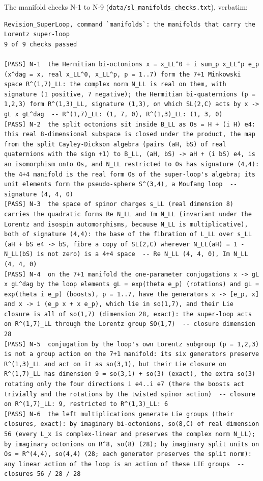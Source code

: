 \documentclass[
  10pt,
]{article}
\begin{document}
The manifold checks N-1 to N-9
(\texttt{data/sl\_manifolds\_checks.txt}), verbatim:

\begin{verbatim}
Revision_SuperLoop, command `manifolds`: the manifolds that carry the Lorentz super-loop
9 of 9 checks passed

[PASS] N-1  the Hermitian bi-octonions x = x_LL^0 + i sum_p x_LL^p e_p (x^dag = x, real x_LL^0, x_LL^p, p = 1..7) form the 7+1 Minkowski space R^(1,7)_LL: the complex norm N_LL is real on them, with signature (1 positive, 7 negative); the Hermitian bi-quaternions (p = 1,2,3) form R^(1,3)_LL, signature (1,3), on which SL(2,C) acts by x -> gL x gL^dag  -- R^(1,7)_LL: (1, 7, 0), R^(1,3)_LL: (1, 3, 0)
[PASS] N-2  the split octonions sit inside B_LL as Os = H + (i H) e4: this real 8-dimensional subspace is closed under the product, the map from the split Cayley-Dickson algebra (pairs (aH, bS) of real quaternions with the sign +1) to B_LL, (aH, bS) -> aH + (i bS) e4, is an isomorphism onto Os, and N_LL restricted to Os has signature (4,4): the 4+4 manifold is the real form Os of the super-loop's algebra; its unit elements form the pseudo-sphere S^(3,4), a Moufang loop  -- signature (4, 4, 0)
[PASS] N-3  the space of spinor charges s_LL (real dimension 8) carries the quadratic forms Re N_LL and Im N_LL (invariant under the Lorentz and isospin automorphisms, because N_LL is multiplicative), both of signature (4,4): the base of the fibration of L_LL over s_LL (aH + bS e4 -> bS, fibre a copy of SL(2,C) wherever N_LL(aH) = 1 - N_LL(bS) is not zero) is a 4+4 space  -- Re N_LL (4, 4, 0), Im N_LL (4, 4, 0)
[PASS] N-4  on the 7+1 manifold the one-parameter conjugations x -> gL x gL^dag by the loop elements gL = exp(theta e_p) (rotations) and gL = exp(theta i e_p) (boosts), p = 1..7, have the generators x -> [e_p, x] and x -> i (e_p x + x e_p), which lie in so(1,7), and their Lie closure is all of so(1,7) (dimension 28, exact): the super-loop acts on R^(1,7)_LL through the Lorentz group SO(1,7)  -- closure dimension 28
[PASS] N-5  conjugation by the loop's own Lorentz subgroup (p = 1,2,3) is not a group action on the 7+1 manifold: its six generators preserve R^(1,3)_LL and act on it as so(3,1), but their Lie closure on R^(1,7)_LL has dimension 9 = so(3,1) + so(3) (exact), the extra so(3) rotating only the four directions i e4..i e7 (there the boosts act trivially and the rotations by the twisted spinor action)  -- closure on R^(1,7)_LL: 9, restricted to R^(1,3)_LL: 6
[PASS] N-6  the left multiplications generate Lie groups (their closures, exact): by imaginary bi-octonions, so(8,C) of real dimension 56 (every L_x is complex-linear and preserves the complex norm N_LL); by imaginary octonions on R^8, so(8) (28); by imaginary split units on Os = R^(4,4), so(4,4) (28; each generator preserves the split norm): any linear action of the loop is an action of these LIE groups  -- closures 56 / 28 / 28

\end{verbatim}
\end{document}

